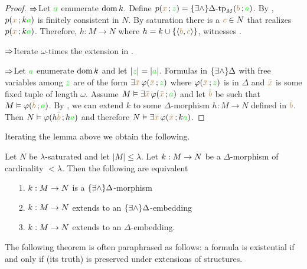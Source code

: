 \begin{proof}
$\Rightarrow$\quad Let ${\color{green} a}$ enumerate $\mathop{\rm dom} k$. Define $p({\color{brown} x}\,;{\color{green} z})=\{\exists\wedge\}\Delta\mbox{\rm -tp}_M ({\color{brown} b}\,;{\color{green} a})$. By , $p({\color{brown} x}\,;k{\color{green} a})$ is finitely consistent in $N$. By saturation there is a ${\color{brown} c}\in N$ that realizes $p({\color{brown} x}\,;k{\color{green} a})$. Therefore, $h:M\to N$ where $h=k\cup\{\langle{\color{brown}b},{\color{brown} c}\rangle\}$, witnesses .

$\Rightarrow$\quad Iterate $\omega$-times the extension in . 

$\Rightarrow$\quad Let ${\color{green} a}$ enumerate $\mathop{\rm dom} k$ and let $|{\color{green} z}|=|{\color{green} a}|$. Formulas in $\{\exists\wedge\}\Delta$ with free variables among ${\color{green} z}$ are of the form  $\exists {\color{brown}\bar x}\, \varphi ({\color{brown}\bar x}\,;{\color{green} z})$ where $\varphi({\color{brown}\bar x}\,;{\color{green} z})$ is in $\Delta$ and ${\color{brown}\bar x}$ is some fixed tuple of length $\omega$. Assume $M\vDash\exists{\color{brown}\bar x}\,\varphi({\color{brown}\bar x}\,;{\color{green} a})$ and let ${\color{brown}\bar b}$ be such that $M\vDash\varphi({\color{brown}\bar b}\,;{\color{green} a})$. By , we can extend $k$ to some $\Delta$-morphism $h:M\to N$ defined in ${\color{brown}\bar b}$. Then $N\vDash\varphi(h{\color{brown}\bar b}\,;h{\color{green} a})$ and therefore $N\vDash\exists {\color{brown}\bar x}\,\varphi({\color{brown}\bar x}\,;k{\color{green} a})$.
\end{proof}

Iterating the lemma above we obtain the following.

\begin{corollary}\label{corol_EDelta_estensione}
Let $N$ be $\lambda$-saturated and let $|M|\le\lambda$. Let $k:M\rightarrow N$ be a $\Delta$-morphism of cardinality $<\lambda$. Then the following are equivalent
\begin{itemize}
\item[1.] $k:M\rightarrow N$ is a $\{\exists\wedge\}\Delta$-morphism
\item[2.] $k:M\rightarrow N$ extends to an $\{\exists\wedge\}\Delta$-embedding
\item[3.] $k:M\rightarrow N$ extends to an $\Delta$-embedding.\QED
\end{itemize}
\end{corollary}

The following theorem is often paraphrased as follows: a formula is existential if and only if (its truth) is preserved under extensions of structures.

